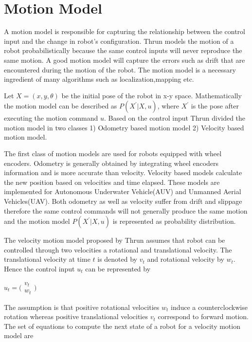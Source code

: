 \documentclass[12pt,draft]{dalcsthesis}
\begin{document}
\section{Motion Model}
\label{chap-:Motion Model}
A motion model is responsible for capturing the relationship between the control input and the change in robot's configuration. Thrun \cite{thrun2005probabilistic} models the motion of a robot probabilistically because the same
control inputs will never reproduce the same motion. A good motion model will capture the errors such as drift that are encountered during the motion of the robot. The motion model is a necessary ingredient of many algorithms such as localization,mapping etc. 

Let $X=(x,y,\theta)$ be the initial pose of the robot in x-y space. Mathematically the motion model can be described as $P(X^{'}|X,u)$, where $X^{'}$ is the pose after executing the motion command $u$. Based on the control input Thrun \cite{thrun2005probabilistic} divided the motion model in two classes 1) Odometry based motion model 2) Velocity based motion model.

The first class of motion models are used for robots equipped with wheel encoders. Odometry is generally obtained by integrating wheel encoders information and is more accurate than velocity.  
Velocity based models calculate the new position based on velocities and time elapsed. These models are implemented for Autonomous Underwater Vehicle(AUV) and Unmanned Aerial Vehicles(UAV). Both odometry as well as velocity suffer from drift and slippage therefore the same control commands will not generally produce the same motion and the motion model $P(X^{'}|X,u)$ is represented as probability distribution.

The velocity motion model proposed by Thrun \cite{thrun2005probabilistic} assumes that robot can be controlled through two velocities a rotational and translational velocity. The translational velocity at time $t$ is denoted by $v_{t}$ and rotational velocity by $w_{t}$. Hence the control input $u_{t}$ can be represented by  
\begin{center}
$u_{t}=\bigl(\begin{array}{c}
                v_{t} \\
                w_{t}
               \end{array}\bigr)$
  
\end{center}

The assumption is that positive rotational velocities $w_{t}$ induce a counterclockwise rotation whereas positive translational velocities $v_{t}$ correspond to forward motion. The set of equations to compute the next state of a robot for a velocity motion model are 
\end{document}

